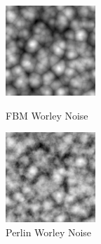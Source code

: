 \begin{figure}[H]
\begin{minipage}[t]{0.32\textwidth}
        \includegraphics[width=\linewidth]{images/fbm_worley.png}
        \caption{FBM Worley Noise}
        \label{fig:fbm_worley}
    \end{minipage}
    \hfill
    \begin{minipage}[t]{0.32\textwidth}
        \centering
        \includegraphics[width=\linewidth]{images/perlin_worley.png}
        \caption{Perlin Worley Noise}
        \label{fig:perlin_worley}
    \end{minipage}
\end{figure}

